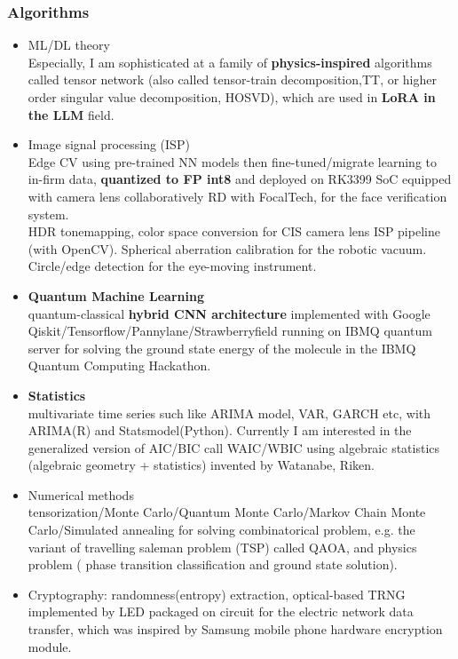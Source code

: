 \documentclass[11pt]{article}
\begin{document}
\begin{multicols*}{2}
\subsubsection*{Algorithms}
\begin{itemize}[noitemsep]
    \item ML/DL theory\\ Especially, I am sophisticated at a family of \textbf{physics-inspired} algorithms called tensor network (also called tensor-train decomposition,TT, or higher order singular value decomposition, HOSVD), which are used in \textbf{LoRA in the LLM} field. 
    \item Image signal processing (ISP) \\
    Edge CV using pre-trained NN models then fine-tuned/migrate learning to in-firm data,\textbf{ quantized to FP int8 }and deployed on RK3399 SoC equipped with camera lens collaboratively RD with FocalTech, for the face verification system.\\
    HDR tonemapping, color space conversion for CIS camera lens ISP pipeline (with OpenCV). Spherical aberration calibration for the robotic vacuum. \\
    Circle/edge detection for the eye-moving instrument.  
    \item \textbf{Quantum Machine Learning}\\ quantum-classical\textbf{ hybrid CNN architecture} implemented with Google Qiskit/Tensorflow/Pannylane/Strawberryfield running on IBMQ quantum server for solving the ground state energy of the molecule in the IBMQ Quantum Computing Hackathon.\\
    \item \textbf{Statistics}\\ multivariate time series such like ARIMA model, VAR, GARCH etc, with ARIMA(R) and Statsmodel(Python). Currently I am interested in the generalized version of AIC/BIC call WAIC/WBIC using algebraic statistics (algebraic geometry + statistics) invented by Watanabe, Riken.
    \item Numerical methods\\tensorization/Monte Carlo/Quantum Monte Carlo/Markov Chain Monte Carlo/Simulated annealing for solving combinatorical problem, e.g. the variant of travelling saleman problem (TSP) called QAOA, and physics problem ( phase transition classification and ground state solution).
    \item Cryptography: randomness(entropy) extraction, optical-based TRNG implemented by LED packaged on circuit for the electric network data transfer, which was inspired by Samsung mobile phone hardware encryption module.
\end{itemize}


\end{multicols*}
\end{document}
